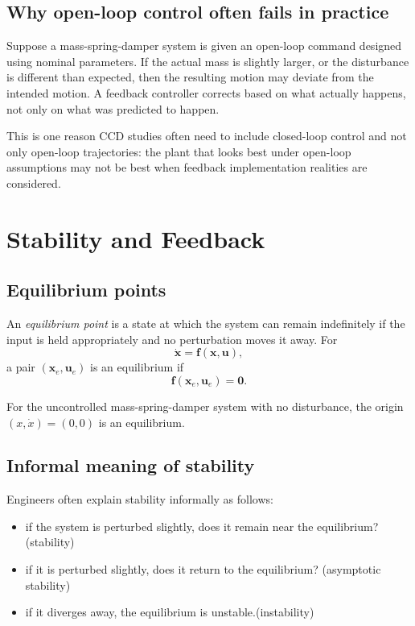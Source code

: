 \documentclass[11pt]{article}
\newcommand{\vect}[1]{\boldsymbol{#1}}
\newcommand{\state}{\vect{x}}
\newcommand{\ctrlu}{\vect{u}}
\begin{document}
\subsection{Why open-loop control often fails in practice}

Suppose a mass-spring-damper system is given an open-loop command designed using nominal parameters. If the actual mass is slightly larger, or the disturbance is different than expected, then the resulting motion may deviate from the intended motion. A feedback controller corrects based on what actually happens, not only on what was predicted to happen.

This is one reason CCD studies often need to include closed-loop control and not only open-loop trajectories: the plant that looks best under open-loop assumptions may not be best when feedback implementation realities are considered.

\section{Stability and Feedback}

\subsection{Equilibrium points}

An \emph{equilibrium point} is a state at which the system can remain indefinitely if the input is held appropriately and no perturbation moves it away. For
\begin{equation}
\dot{\state}=\vect{f}(\state,\ctrlu),
\end{equation}
a pair $(\state_e,\ctrlu_e)$ is an equilibrium if
\begin{equation}
\vect{f}(\state_e,\ctrlu_e)=\vect{0}.
\end{equation}

For the uncontrolled mass-spring-damper system with no disturbance, the origin $(x,\dot{x})=(0,0)$ is an equilibrium.

\subsection{Informal meaning of stability}

Engineers often explain stability informally as follows:
\begin{itemize}[leftmargin=1.4em]
  \item if the system is perturbed slightly, does it remain near the equilibrium? \hfill (stability)
  \item if it is perturbed slightly, does it return to the equilibrium? \hfill (asymptotic stability)
  \item if it diverges away, the equilibrium is unstable.\hfill (instability)
\end{itemize}
\end{document}
